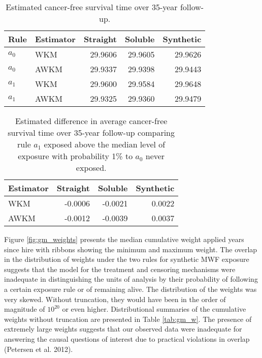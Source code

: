 \documentclass[
  11pt,
]{article}
\begin{document}
\begin{table}[H]
\centering
\caption{Estimated cancer-free survival time over 35-year follow-up.} 
\label{tab:gm_survival}
\begin{tabular}{llrrr}
  \toprule
Rule & Estimator & Straight & Soluble & Synthetic \\ 
  \midrule
$a_0$ & WKM & 29.9606 & 29.9605 & 29.9626 \\ 
  $a_0$ & AWKM & 29.9337 & 29.9398 & 29.9443 \\ 
   \midrule
$a_1$ & WKM & 29.9600 & 29.9584 & 29.9648 \\ 
  $a_1$ & AWKM & 29.9325 & 29.9360 & 29.9479 \\ 
   \bottomrule
\end{tabular}
\end{table}
\begin{table}[H]
\centering
\caption{Estimated difference in average cancer-free survival time over 35-year follow-up comparing rule $a_1$ exposed above the median level of exposure with probability 1\% to $a_0$ never exposed.} 
\label{tab:gm_differences}
\begin{tabular}{lrrr}
  \toprule
Estimator & Straight & Soluble & Synthetic \\ 
  \midrule
WKM & -0.0006 & -0.0021 & 0.0022 \\ 
  AWKM & -0.0012 & -0.0039 & 0.0037 \\ 
   \bottomrule
\end{tabular}
\end{table}

Figure \ref{fig:gm_weights} presents the median cumulative weight
applied years since hire with ribbons showing the minimum and maximum
weight. The overlap in the distribution of weights under the two rules
for synthetic MWF exposure suggests that the model for the treatment and
censoring mechanisms were inadequate in distinguishing the units of
analysis by their probability of following a certain exposure rule or of
remaining alive. The distribution of the weights was very skewed.
Without truncation, they would have been in the order of magnitude of
\(10^{20}\) or even higher. Distributional summaries of the cumulative
weights without truncation are presented in Table \ref{tab:gm_w}. The
presence of extremely large weights suggests that our observed data were
inadequate for answering the causal questions of interest due to
practical violations in overlap (Petersen et al. 2012).
\end{document}
